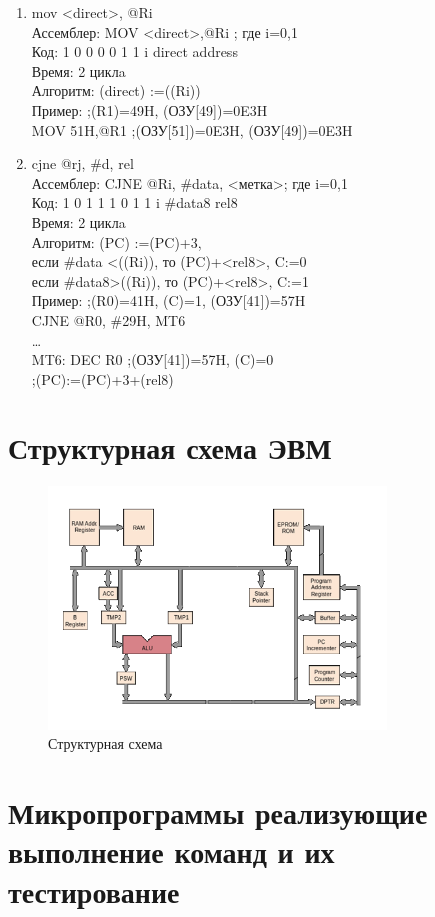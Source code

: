 \begin{enumerate}
\item mov <direct>, @Ri \\
Ассемблер: 	MOV <direct>,@Ri ; где i=0,1 \\
Код:    1 0 0 0 0 1 1 i direct address \\
Время: 	2 циклa \\
Алгоритм: 	(direct) :=((Ri)) \\
Пример: 	        ;(R1)=49H, (ОЗУ[49])=0E3H \\
        MOV 51H,@R1 ;(ОЗУ[51])=0E3H, (ОЗУ[49])=0E3H \\


\item cjne @rj, \#d, rel \\
Ассемблер: 	CJNE @Ri, \#data, <метка>; где i=0,1 \\
Код: 		1 0 1 1 1 0 1 1 i	\#data8	rel8 \\
Время:		2 циклa \\
Алгоритм: 	(PC) :=(PC)+3, \\
		если \#data <((Ri)), то (PC)+<rel8>, C:=0 \\
		если \#data8>((Ri)), то (PC)+<rel8>, C:=1 \\
Пример: 			;(R0)=41H, (C)=1, (ОЗУ[41])=57H \\
		CJNE @R0, \#29H, MT6 \\
		… \\
		MT6: DEC R0	;(ОЗУ[41])=57H, (C)=0 \\
				;(PC):=(PC)+3+(rel8) \\
\end{enumerate}

\chapter{Структурная схема ЭВМ}
\begin{figure}[h!]
\centering
\includegraphics[width=0.8\textwidth]{res/shema.png}
\caption{Структурная схема}
\end{figure}


\chapter{Микропрограммы реализующие выполнение команд и их тестирование}

